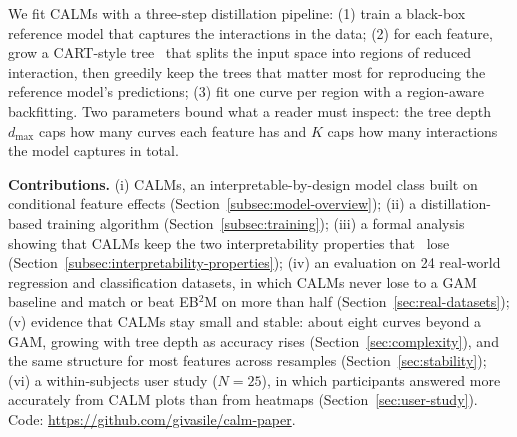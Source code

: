 

We fit CALMs with a three-step distillation pipeline:
(1) train a black-box reference model that captures the interactions in the data;
(2) for each feature, grow a CART-style tree~\cite{herbinger2022REPID} that splits the input space into regions of reduced interaction, then greedily keep the trees that matter most for reproducing the reference model's predictions;
(3) fit one curve per region with a region-aware backfitting.
Two parameters bound what a reader must inspect: the tree depth $d_{\max}$ caps how many curves each feature has and $K$ caps how many interactions the model captures in total.

\textbf{Contributions.}
(i) CALMs, an interpretable-by-design model class built on conditional feature effects (Section~\ref{subsec:model-overview});
(ii) a distillation-based training algorithm (Section~\ref{subsec:training});
(iii) a formal analysis showing that CALMs keep the two interpretability properties that \gamms~lose (Section~\ref{subsec:interpretability-properties});
(iv) an evaluation on 24 real-world regression and classification datasets, in which CALMs never lose to a GAM baseline and match or beat EB$^2$M on more than half (Section~\ref{sec:real-datasets});
(v) evidence that CALMs stay small and stable: about eight curves beyond a GAM, growing with tree depth as accuracy rises (Section~\ref{sec:complexity}), and the same structure for most features across resamples (Section~\ref{sec:stability});
(vi) a within-subjects user study ($N=25$), in which participants answered more accurately from CALM plots than from \gamm{} heatmaps (Section~\ref{sec:user-study}).
Code: \url{https://github.com/givasile/calm-paper}.
